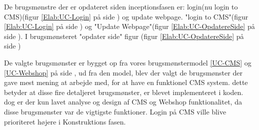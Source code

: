 \noindent De brugsmønstre der er opdateret siden inceptionsfasen er: login(nu login to CMS)(figur \ref{Elab:UC-Login} på side \pageref{Elab:UC-Login}) og update webpage. "login to CMS"(figur \ref{Elab:UC-Login} på side \pageref{Elab:UC-Login}) og "Update Webpage"(figur \ref{Elab:UC-OpdatereSide} på side \pageref{Elab:UC-OpdatereSide}). I brugsmønsteret "opdater side" figur (figur \ref{Elab:UC-OpdatereSide} på side \pageref{Elab:UC-OpdatereSide}) 

\noindent De valgte brugsmønster er bygget op fra vores brugsmønstermodel \ref{UC-CMS} og \ref{UC-Webshop} på side \pageref{UC-CMS}, ud fra den model, blev der valgt de brugsmønster der gave mest mening at arbejde med, for at have en funktionel CMS system. dette betyder at disse fire detaljeret brugsmønster, er blevet implementeret i koden. dog er der kun lavet analyse og design af CMS og Webshop funktionalitet, da disse brugsmønster var de vigtigste funktioner. Login på CMS ville blive prioriteret højere i Konstruktions fasen.  


